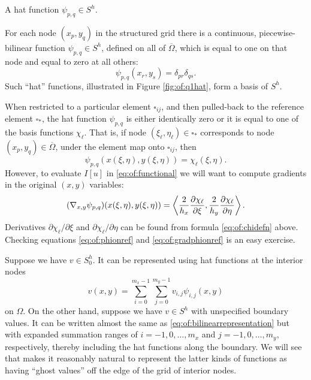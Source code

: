 \begin{marginfigure}

\caption{A hat function $\psi_{p,q} \in S^h$.}
\label{fig:of:q1hat}
\end{marginfigure}

For each node $(x_p,y_q)$ in the structured grid there is a continuous, piecewise-bilinear function $\psi_{p,q} \in S^h$, defined on all of $\overline\Omega$, which is equal to one on that node and equal to zero at all others:
\begin{equation}
  \psi_{p,q}(x_r,y_s) = \delta_{pr} \delta_{qs}.  \label{eq:of:psinodewise}
\end{equation}
Such ``hat'' functions, illustrated in Figure \ref{fig:of:q1hat}, form a basis of $S^h$.

When restricted to a particular element $\square_{ij}$, and then pulled-back to the reference element $\square_\ast$, the hat function $\psi_{p,q}$ is either identically zero or it is equal to one of the basis functions $\chi_\ell$.  That is, if node $(\xi_\ell,\eta_\ell) \in \square_\ast$ corresponds to node $(x_p,y_q) \in \overline\Omega$, under the element map onto $\square_{ij}$, then 
\begin{equation}
  \psi_{p,q}(x(\xi,\eta),y(\xi,\eta)) = \chi_\ell(\xi,\eta).  \label{eq:of:phionref}
\end{equation}
However, to evaluate $I[u]$ in \eqref{eq:of:functional} we will want to compute gradients in the original $(x,y)$ variables:
\begin{equation}
  (\nabla_{x,y} \psi_{p,q})(x(\xi,\eta),y(\xi,\eta)) = \left<\frac{2}{h_x}\frac{\partial\chi_\ell}{\partial \xi},\frac{2}{h_y}\frac{\partial\chi_\ell}{\partial \eta}\right>.   \label{eq:of:gradphionref}
\end{equation}
Derivatives $\partial\chi_\ell/\partial \xi$ and $\partial\chi_\ell/\partial \eta$ can be found from formula \eqref{eq:of:chidefn} above.  Checking equations \eqref{eq:of:phionref} and \eqref{eq:of:gradphionref} is an easy exercise.

Suppose we have $v \in S_0^h$.  It can be represented using hat functions at the interior nodes
\begin{equation}
v(x,y) = \sum_{i=0}^{m_x-1} \sum_{j=0}^{m_y-1} v_{i,j} \psi_{i,j}(x,y) \label{eq:of:bilinearrepresentation}
\end{equation}
on $\Omega$.  On the other hand, suppose we have $v \in S^h$ with unspecified boundary values.  It can be written almost the same as \eqref{eq:of:bilinearrepresentation} but with expanded summation ranges of $i=-1,0,\dots,m_x$ and $j=-1,0,\dots,m_y$, respectively, thereby including the hat functions along the boundary.  We will see that \PETSc makes it reasonably natural to represent the latter kinds of functions as having ``ghost values'' off the edge of the grid of interior nodes.

